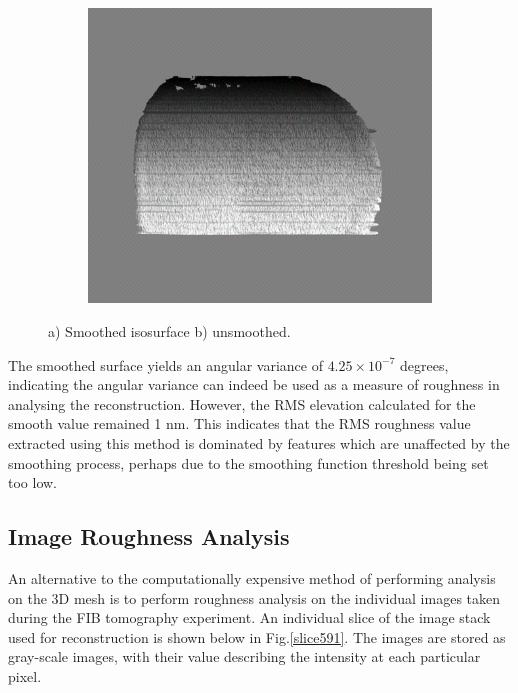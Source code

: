 \begin{figure}[h]
\begin{subfigure}[b]{0.48\textwidth}
	\end{subfigure}%
	\hspace*{0.5cm}
	\begin{subfigure}[b]{0.48\textwidth}
		\centering
		\includegraphics[width=1\linewidth]{Figs/Ch4/may1}
		\caption{}
	\end{subfigure}%
	
	\caption{a) Smoothed isosurface b) unsmoothed.}
	\label{smoothmayavi}
\end{figure}
\FloatBarrier
 
The smoothed surface yields an angular variance of $4.25\times 10^{-7}$ degrees, indicating the angular variance can indeed be used as a measure of roughness in analysing the reconstruction. However, the RMS elevation calculated for the smooth value remained 1 nm. This indicates that the RMS roughness value extracted using this method is dominated by features which are unaffected by the smoothing process, perhaps due to the smoothing function threshold being set too low.

\subsection{Image Roughness Analysis}

An alternative to the computationally expensive method of performing analysis on the 3D mesh is to perform roughness analysis on the individual images taken during the FIB tomography experiment. An individual slice of the image stack used for reconstruction is shown below in Fig.\ref{slice591}. The images are stored as gray-scale images, with their value describing the intensity at each particular pixel.

